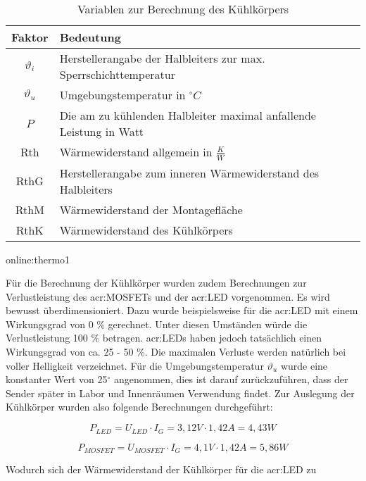 \begin{table}[htb]
	\begin{center}
		\begin{tabular}[h]{cl}	
			\toprule
			Faktor & Bedeutung \\
			\midrule
			$\vartheta_{i}$& Herstellerangabe der Halbleiters zur max. Sperrschichttemperatur\\
			$\vartheta_{u}$& Umgebungstemperatur in $^\circ C$ \\
			$P$ &  Die am zu kühlenden Halbleiter maximal anfallende Leistung in Watt\\
			Rth & Wärmewiderstand allgemein in $\frac{K}{W}$ \\
			RthG & Herstellerangabe zum inneren Wärmewiderstand des Halbleiters \\
			RthM & Wärmewiderstand der Montagefläche \\
			RthK &  Wärmewiderstand des Kühlkörpers \\
			\bottomrule
		\end{tabular}
		\caption{Variablen zur Berechnung des Kühlkörpers}\gls{online:thermo1}
		\label{tab:thermofaktoren}
	\end{center}
\end{table}

Für die Berechnung der Kühlkörper wurden zudem Berechnungen zur Verlustleistung des
\gls{acr:MOSFET}s und der \gls{acr:LED} vorgenommen. Es wird bewusst überdimensioniert. Dazu wurde beispielsweise für die \gls{acr:LED} mit einem Wirkungsgrad von 0 \% gerechnet. Unter diesen Umständen würde die Verlustleistung 100 \% betragen. \gls{acr:LED}s haben jedoch tatsächlich einen Wirkungsgrad von ca. 25 - 50 \%. Die maximalen Verluste werden natürlich bei voller Helligkeit verzeichnet. Für die Umgebungstemperatur $\vartheta_{u}$ wurde eine konstanter Wert von 25$^\circ$ angenommen, dies ist darauf zurückzuführen, dass der Sender später in Labor und Innenräumen Verwendung findet. Zur Auslegung der Kühlkörper wurden also folgende Berechnungen durchgeführt:

\begin{equation}
	\label{equ:thermoled}
	P_{LED} = U_{LED} \cdot I_{G} = 3,12V \cdot 1,42A= 4,43W
\end{equation}

\begin{equation}
	\label{equ:thermomos}
	P_{MOSFET} = U_{MOSFET} \cdot I_{G} = 4,1V \cdot 1,42A= 5,86W
\end{equation}

Wodurch sich der Wärmewiderstand der Kühlkörper für die \gls{acr:LED} zu


